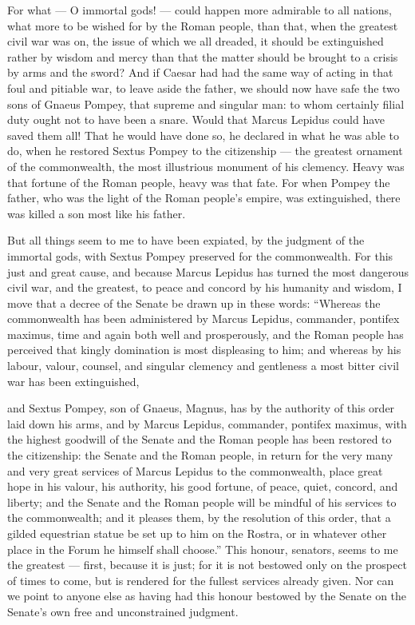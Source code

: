  For what --- O immortal gods! --- could happen more admirable to all nations, what more to be wished for by the Roman people, than that, when the greatest civil war was on, the issue of which we all dreaded, it should be extinguished rather by wisdom and mercy than that the matter should be brought to a crisis by arms and the sword? And if Caesar had had the same way of acting in that foul and pitiable war, to leave aside the father, we should now have safe the two sons of Gnaeus Pompey, that supreme and singular man: to whom certainly filial duty ought not to have been a snare. Would that Marcus Lepidus could have saved them all! That he would have done so, he declared in what he was able to do, when he restored Sextus Pompey to the citizenship --- the greatest ornament of the commonwealth, the most illustrious monument of his clemency. Heavy was that fortune of the Roman people, heavy was that fate. For when Pompey the father, who was the light of the Roman people's empire, was extinguished, there was killed a son most like his father.

 But all things seem to me to have been expiated, by the judgment of the immortal gods, with Sextus Pompey preserved for the commonwealth. For this just and great cause, and because Marcus Lepidus has turned the most dangerous civil war, and the greatest, to peace and concord by his humanity and wisdom, I move that a decree of the Senate be drawn up in these words: ``Whereas the commonwealth has been administered by Marcus Lepidus, commander, pontifex maximus, time and again both well and prosperously, and the Roman people has perceived that kingly domination is most displeasing to him; and whereas by his labour, valour, counsel, and singular clemency and gentleness a most bitter civil war has been extinguished,

 and Sextus Pompey, son of Gnaeus, Magnus, has by the authority of this order laid down his arms, and by Marcus Lepidus, commander, pontifex maximus, with the highest goodwill of the Senate and the Roman people has been restored to the citizenship: the Senate and the Roman people, in return for the very many and very great services of Marcus Lepidus to the commonwealth, place great hope in his valour, his authority, his good fortune, of peace, quiet, concord, and liberty; and the Senate and the Roman people will be mindful of his services to the commonwealth; and it pleases them, by the resolution of this order, that a gilded equestrian statue be set up to him on the Rostra, or in whatever other place in the Forum he himself shall choose.'' This honour, senators, seems to me the greatest --- first, because it is just; for it is not bestowed only on the prospect of times to come, but is rendered for the fullest services already given. Nor can we point to anyone else as having had this honour bestowed by the Senate on the Senate's own free and unconstrained judgment.

